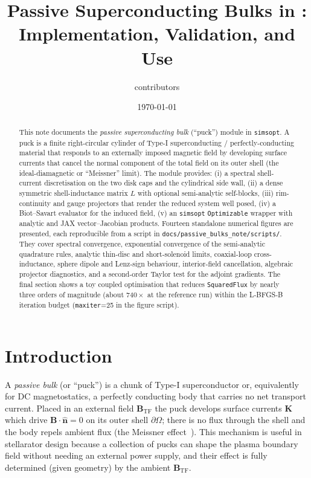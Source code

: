 \documentclass[11pt]{article}
\title{Passive Superconducting Bulks in \simsopt:\\
Implementation, Validation, and Use}
\author{\simsopt{} contributors}
\date{\today}
\newcommand{\simsopt}{\texttt{simsopt}}
\newcommand{\bK}{\mathbf{K}}
\newcommand{\bB}{\mathbf{B}}
\newcommand{\bn}{\hat{\mathbf{n}}}
\begin{document}
\maketitle

\begin{abstract}
This note documents the \emph{passive superconducting bulk} (``puck'')
module in \simsopt{}.  A puck is a finite right-circular cylinder of
Type-I superconducting / perfectly-conducting material that responds to
an externally imposed magnetic field by developing surface currents
that cancel the normal component of the total field on its outer shell
(the ideal-diamagnetic or ``Meissner'' limit).  The module provides:
(i) a spectral shell-current discretisation on the two disk caps and
the cylindrical side wall, (ii) a dense symmetric shell-inductance
matrix $L$ with optional semi-analytic self-blocks, (iii) rim-continuity
and gauge projectors that render the reduced system well posed,
(iv) a Biot--Savart evaluator for the induced field,
(v) an \simsopt{} \texttt{Optimizable} wrapper with analytic and JAX
vector--Jacobian products.  Fourteen standalone numerical figures are
presented, each reproducible from a script in
\texttt{docs/passive\_bulks\_note/scripts/}.  They cover spectral convergence, exponential
convergence of the semi-analytic quadrature rules, analytic thin-disc
and short-solenoid limits, coaxial-loop cross-inductance, sphere dipole
and Lenz-sign behaviour, interior-field cancellation, algebraic
projector diagnostics, and a second-order Taylor test for the adjoint
gradients.  The final section shows a toy coupled optimisation that
reduces \texttt{SquaredFlux} by nearly three orders of magnitude (about
$740\times$ at the reference run) within the L-BFGS-B iteration budget
(\texttt{maxiter}=25 in the figure script).
\end{abstract}

\tableofcontents

\section{Introduction}
\label{sec:intro}

A \emph{passive bulk} (or ``puck'') is a chunk of Type-I
superconductor or, equivalently for DC magnetostatics, a perfectly
conducting body that carries no net transport current.  Placed in an
external field $\bB_{\text{TF}}$ the puck develops surface currents
$\bK$ which drive $\bB\cdot\bn = 0$ on its outer shell $\partial\Omega$;
there is no flux through the shell and the body repels ambient flux
(the Meissner effect~\cite{jackson1998}).  This mechanism is useful in
stellarator design because a collection of pucks can shape the plasma
boundary field without needing an external power supply, and their
effect is fully determined (given geometry) by the ambient
$\bB_{\text{TF}}$.
\end{document}

